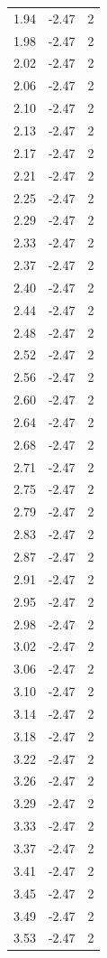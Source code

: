 \begin{longtable}{lrr}
  1.94 & -2.47 & 2 \\
  1.98 & -2.47 & 2 \\
  2.02 & -2.47 & 2 \\
  2.06 & -2.47 & 2 \\
  2.10 & -2.47 & 2 \\
  2.13 & -2.47 & 2 \\
  2.17 & -2.47 & 2 \\
  2.21 & -2.47 & 2 \\
  2.25 & -2.47 & 2 \\
  2.29 & -2.47 & 2 \\
  2.33 & -2.47 & 2 \\
  2.37 & -2.47 & 2 \\
  2.40 & -2.47 & 2 \\
  2.44 & -2.47 & 2 \\
  2.48 & -2.47 & 2 \\
  2.52 & -2.47 & 2 \\
  2.56 & -2.47 & 2 \\
  2.60 & -2.47 & 2 \\
  2.64 & -2.47 & 2 \\
  2.68 & -2.47 & 2 \\
  2.71 & -2.47 & 2 \\
  2.75 & -2.47 & 2 \\
  2.79 & -2.47 & 2 \\
  2.83 & -2.47 & 2 \\
  2.87 & -2.47 & 2 \\
  2.91 & -2.47 & 2 \\
  2.95 & -2.47 & 2 \\
  2.98 & -2.47 & 2 \\
  3.02 & -2.47 & 2 \\
  3.06 & -2.47 & 2 \\
  3.10 & -2.47 & 2 \\
  3.14 & -2.47 & 2 \\
  3.18 & -2.47 & 2 \\
  3.22 & -2.47 & 2 \\
  3.26 & -2.47 & 2 \\
  3.29 & -2.47 & 2 \\
  3.33 & -2.47 & 2 \\
  3.37 & -2.47 & 2 \\
  3.41 & -2.47 & 2 \\
  3.45 & -2.47 & 2 \\
  3.49 & -2.47 & 2 \\
  3.53 & -2.47 & 2 \\

\end{longtable}
